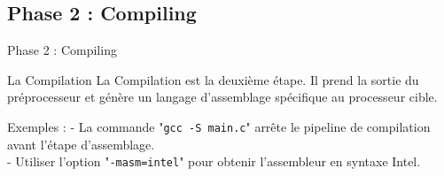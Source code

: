 \subsection{Phase 2 : Compiling}
\begin{frame}{Phase 2 : Compiling}
	\begin{block}{La Compilation}
		La \alert{Compilation} est la deuxième étape. Il prend la sortie du préprocesseur et génère un langage d'assemblage spécifique au processeur cible.
	\end{block}
	\begin{exampleblock}{Exemples :}
		- La commande "\texttt{gcc -S main.c}" arrête le pipeline de compilation avant l'étape d'assemblage.\\
		- Utiliser l'option "\texttt{-masm=intel}" pour obtenir l'assembleur en syntaxe Intel.
	\end{exampleblock}
\end{frame}

